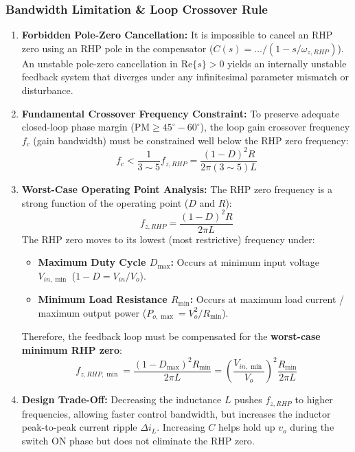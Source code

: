 \subsubsection{Bandwidth Limitation \& Loop Crossover Rule}
\begin{enumerate}
  \item \textbf{Forbidden Pole-Zero Cancellation:} It is impossible to cancel an RHP zero using an RHP pole in the compensator ($C(s) = \dots / (1 - s/\omega_{z,RHP})$). An unstable pole-zero cancellation in $\mathrm{Re}\{s\} > 0$ yields an internally unstable feedback system that diverges under any infinitesimal parameter mismatch or disturbance.
  \item \textbf{Fundamental Crossover Frequency Constraint:}
  To preserve adequate closed-loop phase margin ($\mathrm{PM} \ge 45^\circ - 60^\circ$), the loop gain crossover frequency $f_c$ (gain bandwidth) must be constrained well below the RHP zero frequency:
  \begin{equation}
  \boxed{f_c < \frac{1}{3 \sim 5} f_{z,RHP} = \frac{(1-D)^2 R}{2\pi (3 \sim 5) L}}
  \end{equation}
  \item \textbf{Worst-Case Operating Point Analysis:}
  The RHP zero frequency is a strong function of the operating point ($D$ and $R$):
  \begin{equation}
  f_{z,RHP} = \frac{(1-D)^2 R}{2\pi L}
  \end{equation}
  The RHP zero moves to its lowest (most restrictive) frequency under:
  \begin{itemize}
    \item \textbf{Maximum Duty Cycle $D_{\max}$:} Occurs at minimum input voltage $V_{in,\min}$ ($1 - D = V_{in}/V_o$).
    \item \textbf{Minimum Load Resistance $R_{\min}$:} Occurs at maximum load current / maximum output power ($P_{o,\max} = V_o^2 / R_{\min}$).
  \end{itemize}
  Therefore, the feedback loop must be compensated for the \textbf{worst-case minimum RHP zero}:
  \begin{equation}
  \boxed{f_{z,RHP,\min} = \frac{(1 - D_{\max})^2 R_{\min}}{2\pi L} = \left(\frac{V_{in,\min}}{V_o}\right)^2 \frac{R_{\min}}{2\pi L}}
  \end{equation}
  \item \textbf{Design Trade-Off:} Decreasing the inductance $L$ pushes $f_{z,RHP}$ to higher frequencies, allowing faster control bandwidth, but increases the inductor peak-to-peak current ripple $\Delta i_L$. Increasing $C$ helps hold up $v_o$ during the switch ON phase but does not eliminate the RHP zero.
\end{enumerate}

